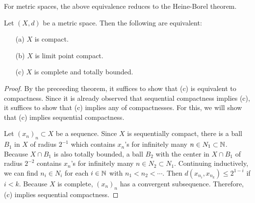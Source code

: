 For metric spaces, the above equivalence reduces to the Heine-Borel theorem.
\begin{thm}
    Let $(X, d)$ be a metric space.
    Then the following are equivalent:
    \begin{enumerate}
        \item[(a)]
        {
            $X$ is compact.
        }
        \item[(b)]
        {
            $X$ is limit point compact.
        }
        \item[(c)]
        {
            $X$ is complete and totally bounded.
        }
    \end{enumerate}
\end{thm}
\begin{proof}
    By the preceeding theorem, it suffices to show that (c) is equivalent to compactness.
    Since it is already observed that sequential compactness implies (c), it suffices to show that (c) implies any of compactnesses.
    For this, we will show that (c) implies sequential compactness.

    Let $(x_n)_n\subset X$ be a sequence.
    Since $X$ is sequentially compact, there is a ball $B_1$ in $X$ of radius $2^{-1}$ which contains $x_n$'s for infinitely many $n\in N_1\subset{\mathbb{N}}$.
    Because $X\cap B_1$ is also totally bounded, a ball $B_2$ with the center in $X\cap B_1$ of radius $2^{-2}$ contains $x_n$'s for infinitely many $n\in N_2\subset N_1$.
    Continuing inductively, we can find $n_i\in N_i$ for each $i\in{\mathbb{N}}$ with $n_1<n_2<\cdots$.
    Then $d(x_{n_i}, x_{n_k})\leq 2^{1-i}$ if $i<k$.
    Because $X$ is complete, $(x_n)_n$ has a convergent subsequence.
    Therefore, (c) implies sequential compactness.
\end{proof}

